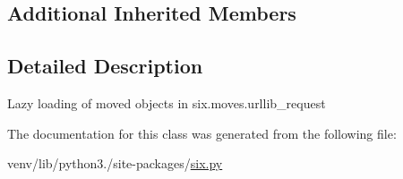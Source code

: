 \subsection*{Additional Inherited Members}


\subsection{Detailed Description}
\begin{DoxyVerb}Lazy loading of moved objects in six.moves.urllib_request\end{DoxyVerb}
 

The documentation for this class was generated from the following file\+:\begin{DoxyCompactItemize}
\item 
venv/lib/python3./site-\/packages/\hyperlink{six_8py}{six.\+py}\end{DoxyCompactItemize}
